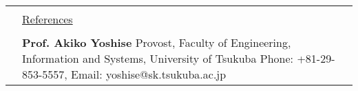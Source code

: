 \documentclass[a4paper,11pt]{article}
\newcommand{\headingfont}{\LARGE \MakeUppercase }
\newenvironment{SectionTable}[1]{
	\renewcommand*{\arraystretch}{1.0}
	\setlength{\tabcolsep}{10pt}
	\begin{longtable}{Rp{5.2in}} 
		\rule{2.3cm}{4pt} 
		& \underline{#1} \\ %
	}
	{
	\end{longtable}\vspace{-.3cm}
}
\begin{document}
\begin{SectionTable}{\headingfont References}
	&
	\textbf{Prof. Akiko Yoshise} \newline
	Provost, Faculty of Engineering, Information and Systems, University of Tsukuba \newline 
	Phone: +81-29-853-5557, Email: yoshise@sk.tsukuba.ac.jp \\
	
	
%	
\end{SectionTable}
	

\label{LastPage}  %
\end{document}
